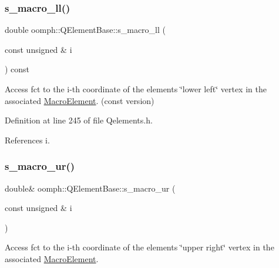 \subsubsection{\texorpdfstring{s\+\_\+macro\+\_\+ll()}{s\_macro\_ll()}\hspace{0.1cm}{\footnotesize\ttfamily [2/2]}}
{\footnotesize\ttfamily double oomph\+::\+Q\+Element\+Base\+::s\+\_\+macro\+\_\+ll (\begin{DoxyParamCaption}\item[{const unsigned \&}]{i }\end{DoxyParamCaption}) const\hspace{0.3cm}{\ttfamily [inline]}}



Access fct to the i-\/th coordinate of the element\textquotesingle{}s \char`\"{}lower left\char`\"{} vertex in the associated \hyperlink{classoomph_1_1MacroElement}{Macro\+Element}. (const version) 



Definition at line 245 of file Qelements.\+h.



References i.

\mbox{\label{classoomph_1_1QElementBase_aec37122110d976a88d60a061262592a2}} 
\subsubsection{\texorpdfstring{s\+\_\+macro\+\_\+ur()}{s\_macro\_ur()}\hspace{0.1cm}{\footnotesize\ttfamily [1/2]}}
{\footnotesize\ttfamily double\& oomph\+::\+Q\+Element\+Base\+::s\+\_\+macro\+\_\+ur (\begin{DoxyParamCaption}\item[{const unsigned \&}]{i }\end{DoxyParamCaption})\hspace{0.3cm}{\ttfamily [inline]}}



Access fct to the i-\/th coordinate of the element\textquotesingle{}s \char`\"{}upper right\char`\"{} vertex in the associated \hyperlink{classoomph_1_1MacroElement}{Macro\+Element}. 



